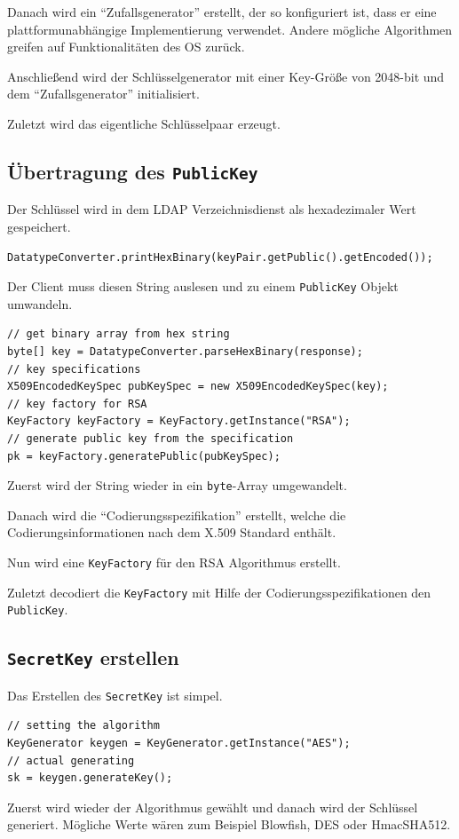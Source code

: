 Danach wird ein ``Zufallsgenerator'' erstellt, der so konfiguriert ist, dass er eine plattformunabhängige Implementierung verwendet. Andere mögliche Algorithmen greifen auf Funktionalitäten des OS zurück.

Anschließend wird der Schlüsselgenerator mit einer Key-Größe von 2048-bit und dem ``Zufallsgenerator'' initialisiert.

Zuletzt wird das eigentliche Schlüsselpaar erzeugt.
\subsection{Übertragung des \texttt{PublicKey}}
Der Schlüssel wird in dem LDAP Verzeichnisdienst als hexadezimaler Wert gespeichert.
\begin{lstlisting}[style=Java, caption=Hexadezimale String-Darstellung des \texttt{PublicKey}]
DatatypeConverter.printHexBinary(keyPair.getPublic().getEncoded());
\end{lstlisting}
Der Client muss diesen String auslesen und zu einem \texttt{PublicKey} Objekt umwandeln.
\clearpage
\begin{lstlisting}[style=Java, caption=Umwandlung eines Strings zu einem gültigen \texttt{PublicKey}]
// get binary array from hex string
byte[] key = DatatypeConverter.parseHexBinary(response);
// key specifications
X509EncodedKeySpec pubKeySpec = new X509EncodedKeySpec(key);
// key factory for RSA
KeyFactory keyFactory = KeyFactory.getInstance("RSA");
// generate public key from the specification
pk = keyFactory.generatePublic(pubKeySpec);
\end{lstlisting}
Zuerst wird der String wieder in ein \texttt{byte}-Array umgewandelt.

Danach wird die ``Codierungsspezifikation'' erstellt, welche die Codierungsinformationen nach dem X.509 Standard enthält.

Nun wird eine \texttt{KeyFactory} für den RSA Algorithmus erstellt.

Zuletzt decodiert die \texttt{KeyFactory} mit Hilfe der Codierungsspezifikationen den \texttt{PublicKey}.
\subsection{\texttt{SecretKey} erstellen}
Das Erstellen des \texttt{SecretKey} ist simpel.
\begin{lstlisting}[style=Java, caption=Erstellen des \texttt{SecretKey}]
// setting the algorithm
KeyGenerator keygen = KeyGenerator.getInstance("AES");
// actual generating
sk = keygen.generateKey();
\end{lstlisting}
Zuerst wird wieder der Algorithmus gewählt und danach wird der Schlüssel generiert. Mögliche Werte wären zum Beispiel Blowfish, DES oder HmacSHA512.
